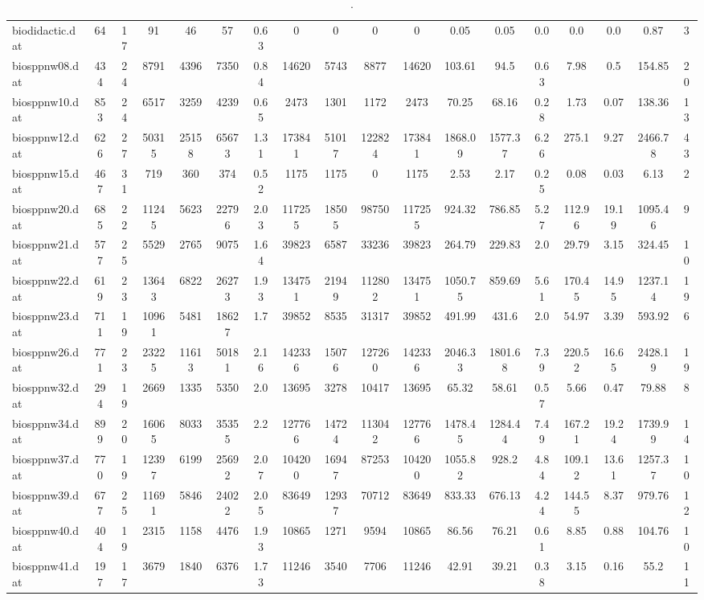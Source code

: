 \begin{sidewaystable}[h]
{\begin{tabular}{lccccccccccccccccc}
biodidactic.dat & 64 & 17 & 91 & 46 & 57 & 0.63 & 0 & 0 & 0 & 0 & 0.05 & 0.05 & 0.0 & 0.0 & 0.0 & 0.87 & 3\\
biosppnw08.dat & 434 & 24 & 8791 & 4396 & 7350 & 0.84 & 14620 & 5743 & 8877 & 14620 & 103.61 & 94.5 & 0.63 & 7.98 & 0.5 & 154.85 & 20\\
biosppnw10.dat & 853 & 24 & 6517 & 3259 & 4239 & 0.65 & 2473 & 1301 & 1172 & 2473 & 70.25 & 68.16 & 0.28 & 1.73 & 0.07 & 138.36 & 13\\
biosppnw12.dat & 626 & 27 & 50315 & 25158 & 65673 & 1.31 & 173841 & 51017 & 122824 & 173841 & 1868.09 & 1577.37 & 6.26 & 275.1 & 9.27 & 2466.78 & 43\\
biosppnw15.dat & 467 & 31 & 719 & 360 & 374 & 0.52 & 1175 & 1175 & 0 & 1175 & 2.53 & 2.17 & 0.25 & 0.08 & 0.03 & 6.13 & 2\\
biosppnw20.dat & 685 & 22 & 11245 & 5623 & 22796 & 2.03 & 117255 & 18505 & 98750 & 117255 & 924.32 & 786.85 & 5.27 & 112.96 & 19.19 & 1095.46 & 9\\
biosppnw21.dat & 577 & 25 & 5529 & 2765 & 9075 & 1.64 & 39823 & 6587 & 33236 & 39823 & 264.79 & 229.83 & 2.0 & 29.79 & 3.15 & 324.45 & 10\\
biosppnw22.dat & 619 & 23 & 13643 & 6822 & 26273 & 1.93 & 134751 & 21949 & 112802 & 134751 & 1050.75 & 859.69 & 5.61 & 170.45 & 14.95 & 1237.14 & 19\\
biosppnw23.dat & 711 & 19 & 10961 & 5481 & 18627 & 1.7 & 39852 & 8535 & 31317 & 39852 & 491.99 & 431.6 & 2.0 & 54.97 & 3.39 & 593.92 & 6\\
biosppnw26.dat & 771 & 23 & 23225 & 11613 & 50181 & 2.16 & 142336 & 15076 & 127260 & 142336 & 2046.33 & 1801.68 & 7.39 & 220.52 & 16.65 & 2428.19 & 19\\
biosppnw32.dat & 294 & 19 & 2669 & 1335 & 5350 & 2.0 & 13695 & 3278 & 10417 & 13695 & 65.32 & 58.61 & 0.57 & 5.66 & 0.47 & 79.88 & 8\\
biosppnw34.dat & 899 & 20 & 16065 & 8033 & 35355 & 2.2 & 127766 & 14724 & 113042 & 127766 & 1478.45 & 1284.44 & 7.49 & 167.21 & 19.24 & 1739.99 & 14\\
biosppnw37.dat & 770 & 19 & 12397 & 6199 & 25692 & 2.07 & 104200 & 16947 & 87253 & 104200 & 1055.82 & 928.2 & 4.84 & 109.12 & 13.61 & 1257.37 & 10\\
biosppnw39.dat & 677 & 25 & 11691 & 5846 & 24022 & 2.05 & 83649 & 12937 & 70712 & 83649 & 833.33 & 676.13 & 4.24 & 144.55 & 8.37 & 979.76 & 12\\
biosppnw40.dat & 404 & 19 & 2315 & 1158 & 4476 & 1.93 & 10865 & 1271 & 9594 & 10865 & 86.56 & 76.21 & 0.61 & 8.85 & 0.88 & 104.76 & 10\\
biosppnw41.dat & 197 & 17 & 3679 & 1840 & 6376 & 1.73 & 11246 & 3540 & 7706 & 11246 & 42.91 & 39.21 & 0.38 & 3.15 & 0.16 & 55.2 & 11\\
\bottomrule
\end{tabular}%
}%
\caption{.}
\label{tab:table_bc}
\end{sidewaystable}

